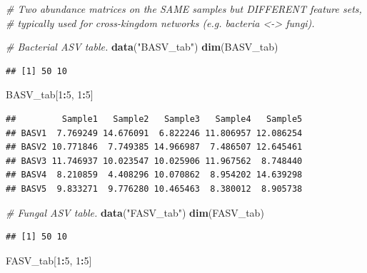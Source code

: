\documentclass[
]{book}
\newenvironment{Shaded}{\begin{snugshade}}{\end{snugshade}}
\newcommand{\CommentTok}[1]{\textcolor[rgb]{0.56,0.35,0.01}{\textit{#1}}}
\newcommand{\DecValTok}[1]{\textcolor[rgb]{0.00,0.00,0.81}{#1}}
\newcommand{\FunctionTok}[1]{\textcolor[rgb]{0.13,0.29,0.53}{\textbf{#1}}}
\newcommand{\NormalTok}[1]{#1}
\newcommand{\SpecialCharTok}[1]{\textcolor[rgb]{0.81,0.36,0.00}{\textbf{#1}}}
\newcommand{\StringTok}[1]{\textcolor[rgb]{0.31,0.60,0.02}{#1}}
\begin{document}
\begin{Shaded}
\begin{Highlighting}[]
\CommentTok{\# Two abundance matrices on the SAME samples but DIFFERENT feature sets,}
\CommentTok{\# typically used for cross{-}kingdom networks (e.g. bacteria \textless{}{-}\textgreater{} fungi).}

\CommentTok{\# Bacterial ASV table.}
\FunctionTok{data}\NormalTok{(}\StringTok{"BASV\_tab"}\NormalTok{)}
\FunctionTok{dim}\NormalTok{(BASV\_tab)}
\end{Highlighting}
\end{Shaded}

\begin{verbatim}
## [1] 50 10
\end{verbatim}

\begin{Shaded}
\begin{Highlighting}[]
\NormalTok{BASV\_tab[}\DecValTok{1}\SpecialCharTok{:}\DecValTok{5}\NormalTok{, }\DecValTok{1}\SpecialCharTok{:}\DecValTok{5}\NormalTok{]}
\end{Highlighting}
\end{Shaded}

\begin{verbatim}
##         Sample1   Sample2   Sample3   Sample4   Sample5
## BASV1  7.769249 14.676091  6.822246 11.806957 12.086254
## BASV2 10.771846  7.749385 14.966987  7.486507 12.645461
## BASV3 11.746937 10.023547 10.025906 11.967562  8.748440
## BASV4  8.210859  4.408296 10.070862  8.954202 14.639298
## BASV5  9.833271  9.776280 10.465463  8.380012  8.905738
\end{verbatim}

\begin{Shaded}
\begin{Highlighting}[]
\CommentTok{\# Fungal ASV table.}
\FunctionTok{data}\NormalTok{(}\StringTok{"FASV\_tab"}\NormalTok{)}
\FunctionTok{dim}\NormalTok{(FASV\_tab)}
\end{Highlighting}
\end{Shaded}

\begin{verbatim}
## [1] 50 10
\end{verbatim}

\begin{Shaded}
\begin{Highlighting}[]
\NormalTok{FASV\_tab[}\DecValTok{1}\SpecialCharTok{:}\DecValTok{5}\NormalTok{, }\DecValTok{1}\SpecialCharTok{:}\DecValTok{5}\NormalTok{]}
\end{Highlighting}
\end{Shaded}
\end{document}

